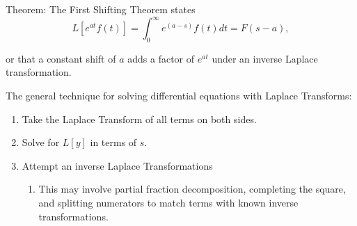 \documentclass[a4paper,10pt]{report}
\begin{document}
Theorem: The First Shifting Theorem states
\begin{equation}
	L[e^{at} f(t)] = \int_0^\infty e^{(a-s)}f(t)dt = F(s-a),
\end{equation}

or that a constant shift of $a$ adds a factor of $e^{at}$ under an inverse Laplace transformation.

The general technique for solving differential equations with Laplace Transforms:
\begin{enumerate}
	\item Take the Laplace Transform of all terms on both sides.
	\item Solve for $L[y]$ in terms of $s$.
	\item Attempt an inverse Laplace Transformations
	\begin{enumerate}
		\item This may involve partial fraction decomposition, completing the square, and splitting numerators to match terms with known inverse transformations.
	\end{enumerate}

\end{enumerate}
\end{document}
